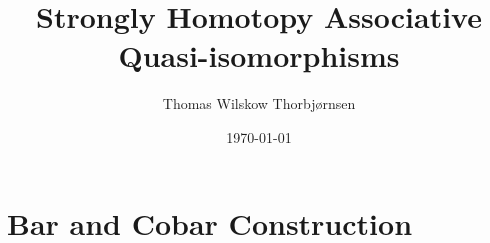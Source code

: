 \documentclass[american,titlepage]{ntnuthesis}
\title{Strongly Homotopy Associative Quasi-isomorphisms}
\author{Thomas Wilskow Thorbjørnsen}
\date{\today}
\begin{document}
    


    \tableofcontents %

    \printglossary[type=\acronymtype] %
    \printglossary                    %


    \chapter{Bar and Cobar Construction}
        


    \chapter*{\bibname}
    \printbibliography[heading=none]


    \appendix
\end{document}
